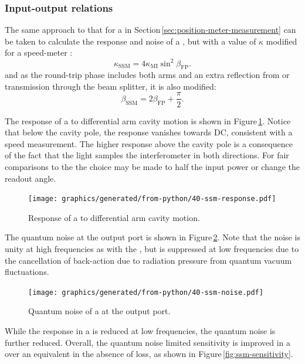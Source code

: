 \subsubsection{Input-output relations}
The same approach to that for a \FPMI{} in Section\,\ref{sec:position-meter-measurement} can be taken to calculate the response and noise of a \SM{}, but with a value of $\kappa$ modified for a speed-meter \cite{Chen2003}:
\begin{equation}
  \kappa_{\text{SSM}} = 4 \kappa_{\text{MI}} \sin^2 \beta_{\text{FP}}.
\end{equation}
and as the round-trip phase includes both arms and an extra reflection from or transmission through the beam splitter, it is also modified:
\begin{equation}
  \beta_{\text{SSM}} = 2 \beta_{\text{FP}} + \frac{\pi}{2}.
\end{equation}

The response of a \SSM{} to differential arm cavity motion is shown in Figure\,\ref{fig:ssm-response}. Notice that below the cavity pole, the response vanishes towards \gls{DC}, consistent with a speed measurement. The higher response above the cavity pole is a consequence of the fact that the light samples the interferometer in both directions. For fair comparisons to the \MI{} the choice may be made to half the input power or change the readout angle.

\begin{figure}
  \centering
  \texttt{[image: graphics/generated/from-python/40-ssm-response.pdf]}
  \caption[Response of a \SSM{} to differential arm cavity motion]{\label{fig:ssm-response}Response of a \SSM{} to differential arm cavity motion.}
\end{figure}

The quantum noise at the output port is shown in Figure\,\ref{fig:ssm-noise}. Note that the noise is unity at high frequencies as with the \FPMI{}, but is suppressed at low frequencies due to the cancellation of back-action due to radiation pressure from quantum vacuum fluctuations.

\begin{figure}
  \centering
  \texttt{[image: graphics/generated/from-python/40-ssm-noise.pdf]}
  \caption[Quantum noise of a \SSM{} at the output port]{\label{fig:ssm-noise}Quantum noise of a \SSM{} at the output port.}
\end{figure}

While the response in a \SSM{} is reduced at low frequencies, the quantum noise is further reduced. Overall, the quantum noise limited sensitivity is improved in a \SSM{} over an equivalent \FPMI{} in the absence of loss, as shown in Figure\,\ref{fig:ssm-sensitivity}.

